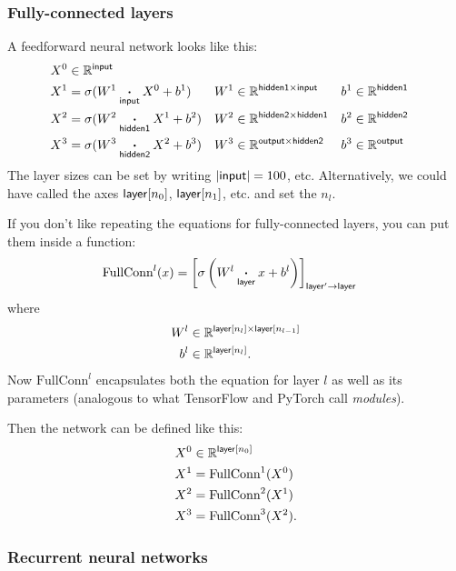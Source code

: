 \documentclass{article}
\begin{document}
\subsubsection{Fully-connected layers}

A feedforward neural network looks like this:
\begin{align*}
  X^0 &\in \mathbb{R}^{\name{input}} \\
  X^1 &= \sigma(W^1 \ndot{input} X^0 + b^1) & W^1 &\in \mathbb{R}^{\name{hidden1} \times \name{input}} & b^1 &\in \mathbb{R}^{\name{hidden1}} \\
  X^2 &= \sigma(W^2 \ndot{hidden1} X^1 + b^2) & W^2 &\in \mathbb{R}^{\name{hidden2} \times \name{hidden1}} & b^2 &\in \mathbb{R}^{\name{hidden2}} \\
  X^3 &= \sigma(W^3 \ndot{hidden2} X^2 + b^3) & W^3 &\in \mathbb{R}^{\name{output} \times \name{hidden2}} & b^3 &\in \mathbb{R}^{\name{output}}
\end{align*}
The layer sizes can be set by writing $|\name{input}| = 100$, etc. Alternatively, we could have called the axes $\name{layer}[n_0]$, $\name{layer}[n_1]$, etc. and set the $n_l$.

If you don't like repeating the equations for fully-connected layers, you can put them inside a function:
\begin{align*}
  \text{FullConn}^l(x) &= \nmov{layer'}{layer}{\sigma\left(W^l \ndot{layer} x + b^l\right)}
\end{align*}
where
\begin{align*}
  W^l &\in \mathbb{R}^{\nset{layer}{n_{l}} \times \nset{layer}{n_{l-1}}} \\
  b^l &\in \mathbb{R}^{\nset{layer}{n_l}}.
\end{align*}
Now $\text{FullConn}^l$ encapsulates both the equation for layer $l$ as well as its parameters (analogous to what TensorFlow and PyTorch call \emph{modules}).

Then the network can be defined like this:
\begin{align*}
  X^0 &\in \mathbb{R}^{\nset{layer}{n_0}} \\
  X^1 &= \text{FullConn}^1(X^0) \\
  X^2 &= \text{FullConn}^2(X^1) \\
  X^3 &= \text{FullConn}^3(X^2).
\end{align*}

\subsubsection{Recurrent neural networks}
\label{sec:rnn}
\end{document}
